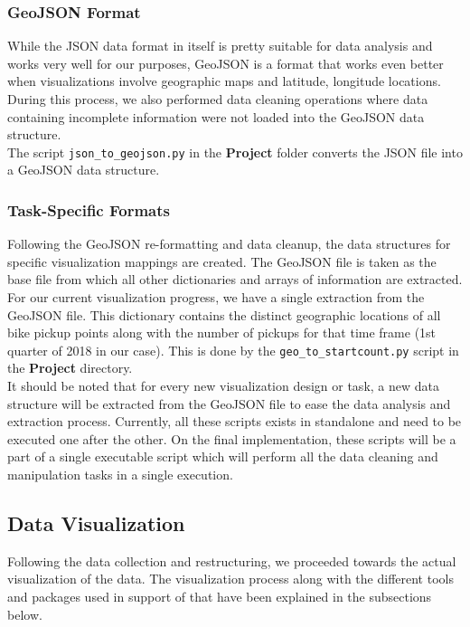 \subsubsection{GeoJSON Format}
While the JSON data format in itself is pretty suitable for data analysis and works very well for our purposes, GeoJSON is a format that works even better when visualizations involve geographic maps and latitude, longitude locations. During this process, we also performed data cleaning operations where data containing incomplete information were not loaded into the GeoJSON data structure.\\
The script \texttt{json\_to\_geojson.py} in the \textbf{Project} folder converts the JSON file into a GeoJSON data structure.

\subsubsection{Task-Specific Formats}
Following the GeoJSON re-formatting and data cleanup, the data structures for specific visualization mappings are created. The GeoJSON file is taken as the base file from which all other dictionaries and arrays of information are extracted.\\
For our current visualization progress, we have a single extraction from the GeoJSON file. This dictionary contains the distinct geographic locations of all bike pickup points along with the number of pickups for that time frame (1st quarter of 2018 in our case). This is done by the \texttt{geo\_to\_startcount.py} script in the \textbf{Project} directory.\newline\\ It should be noted that for every new visualization design or task, a new data structure will be extracted from the GeoJSON file to ease the data analysis and extraction process.
Currently, all these scripts exists in standalone and need to be executed one after the other. On the final implementation, these scripts will be a part of a single executable script which will perform all the data cleaning and manipulation tasks in a single execution.

\subsection{Data Visualization}
Following the data collection and restructuring, we proceeded towards the actual visualization of the data. The visualization process along with the different tools and packages used in support of that have been explained in the subsections below.

